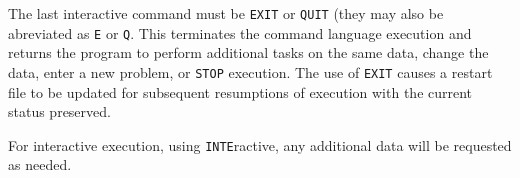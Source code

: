 \headb

The last interactive command must be {\tt EXIT}  or
{\tt QUIT} (they may also be abreviated as {\tt E} or {\tt Q}.
This terminates the command language execution and returns the
program to perform additional
tasks on the same data, change the data, enter a new problem, or
{\tt STOP} execution.  The use of {\tt EXIT} causes a restart file
to be updated for subsequent resumptions of execution with
the current status preserved.

For interactive execution, using {\tt INTE}ractive, any additional
data will be requested as needed.
\vfill\eject
